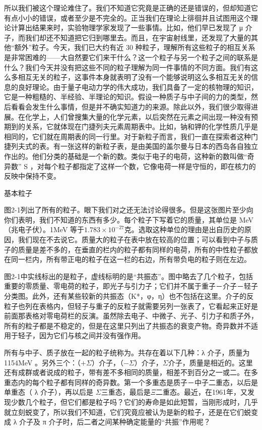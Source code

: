 \documentclass[11pt,oneside]{book}
\begin{document}
\begin{common-format}
所以我们被这个理论难住了。我们不知道它究竟是正确的还是错误的，但却知道它有点小小的错误，或者至少是不完全的。正当我们在理论上徘徊并且试图用这个理论计算出结果来时，实验物理学家发现了一些事情。比如，他们早已发现了 μ 介子，而我们却还不知道把它归到哪里去。而且，在宇宙射线里，还发现了大量的其他“额外”粒子。今天，我们已大约有近 30 种粒子，理解所有这些粒子的相互关系是非常困难的——大自然要它们来干什么？这一个粒子与另一个粒子之间的联系是什么？我们今天并没有把这些不同的粒子理解为同一件事情的不同方面。我们有这么多相互无关的粒子，这事件本身就表明了没有一个能够说明这么多相互无关的信息的良好理论。由于量子电动力学的伟大成功，我们具备了一定的核物理的知识，它是一种粗糙的、半经验、半理论的知识。假设一种质子与中子间的力的类型，然后看看会发生什么事情，但是并不确实知道力的来源。除此以外，我们很少取得进展。在化学上，人们曾搜集大量的化学元素，以后突然在元素之间出现一种没有预期到的关系，它就体现在门捷列夫元素周期表中。比如，钠和钾的化学性质几乎是相同的，它们就在周期表的同一行里。对于新粒子而言，我们一直在探索者这种门捷列夫式的表。有一张这样的新粒子表，是由美国的盖尔曼与日本的西岛各自独立作出的。他们分类的基础是一个新的数。类似于电子的电荷，这种新的数叫做“奇异数” S ，对每个粒子都指定了这样一个数，它像电荷一样是守恒的，即在核力的反映中保持不变。
\begin{linefig}{基本粒子}
\label{fig:基本粒子}
\end{linefig}
图2-1列出了所有的粒子。眼下我们对之还无法讨论得很多。但是这张图片至少向你们表明，我们不知道的东西有多少。每个粒子下写着它的质量，其单位是 MeV（兆电子伏）。1MeV 等于$ 1.783\times10^{-27} $克。选取这种单位的理由是出自历史的原因，我们现在不去说它。质量大的粒子在表中放在较高的位置；可以看到中子与质子的质量是差不多的，在垂直的栏内的粒子都有同样的电荷，所有的中性粒子都放在同一栏内，所有带正电的粒子在这一栏的右边，所有带负电的粒子则在左边。

图2-1中实线标出的是粒子，虚线标明的是“共振态”。图中略去了几个粒子，包括重要的零质量、零电荷的粒子，即光子与引力子；它们并不属于重子－介子－轻子分类图。此外，还有某些较新的共振态（K*，φ，η）也不包括在这里。介子的反粒子也列在表格内，但轻子与重子的反粒子就需要另列一张表了，它看起来正好是前面那表格对零电荷栏的反演。虽然除去电子、中微子、光子、引力子和质子外，所有的粒子都是不稳定的，但是在这里只列出了共振态的衰变产物。奇异数并不适用于轻子，因为它们与核之间并没有强作用。

所有与中子、质子放在一起的粒子统称为。共存在着以下几种：λ 介子，质量为 1154MeV 。另外三个：（$ +\Sigma $）介子，（$ -\Sigma $）介子，$ \Sigma $介子，质量是相近的。这里还有成群或者说成的粒子，带有差不多相同的质量，相差不到百分之一或二。在多重态内的每个粒子都有同样的奇异数。第一个多重态是质子－中子二重态，以后是单重态（ λ 介子），再以后是 $ \Sigma $三重态，最后是$ \Xi $二重态。最近，在1961年，又发现少数几个粒子，但它们都是粒子吗？它们的寿命是如此短暂，当刚形成时，几乎就立刻蜕变了，所以我们不知道，它们究竟应被认为是新的粒子，还是在它们蜕变成 λ 介子及 π 介子时，后二者之间某种确定能量的“共振”作用呢？


\end{common-format}
\end{document}
